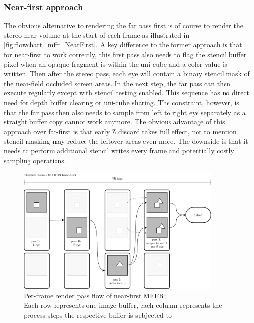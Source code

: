 \subsubsection{Near-first approach}
The obvious alternative to rendering the far pass first is of course to render the stereo near volume at the start of each frame as illustrated in \autoref{fig:flowchart_mffr_NearFirst}. A key difference to the former approach is that for near-first to work correctly, this first pass also needs to flag the stencil buffer pixel when an opaque fragment is within the uni-cube and a color value is written. Then after the stereo pass, each eye will contain a binary stencil mask of the near-field occluded screen areas. In the next step, the far pass can then execute regularly except with stencil testing enabled. This sequence has no direct need for depth buffer clearing or uni-cube sharing. The constraint, however, is that the far pass then also needs to sample from left to right eye separately as a straight buffer copy cannot work anymore. 
The obvious advantage of this approach over far-first is that early Z discard takes full effect, not to mention stencil masking may reduce the leftover areas even more. The downside is that it needs to perform additional stencil writes every frame and potentially costly sampling operations.

\begin{figure}[htb]
  \centering
  \includegraphics[width=0.9\textwidth]{pictures/MFFR_nearfirst}
  \caption{Per-frame render pass flow of near-first MFFR; \\
  Each row represents one image buffer, each column represents the process steps the respective buffer is subjected to} \label{fig:flowchart_mffr_NearFirst}
\end{figure}
 
